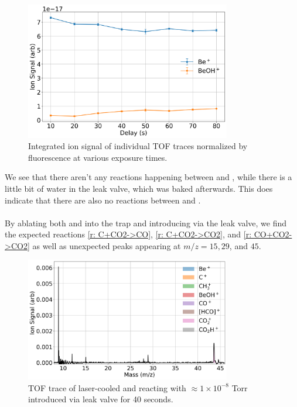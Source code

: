 \begin{figure}[H]
	\label{fig: Be+CO2 traces}
	\centering
	\includegraphics[width=0.8\textwidth]{images/Be_CO2_traces.png}
	\caption{Integrated ion signal of individual TOF traces normalized by  fluorescence at various  exposure times.}
\end{figure}

We see that there aren't any reactions happening between  and , while there is a little bit of water in the leak valve, which was baked afterwards. This does indicate that there are also no reactions between  and .

\paragraph{}
By ablating both  and  into the trap and introducing  via the leak valve, we find the expected reactions \ref{r: C+CO2->CO}, \ref{r: C+CO2->CO2}, and \ref{r: CO+CO2->CO2} as well as unexpected peaks appearing at $m/z=15, 29$, and $45$.

\begin{figure}
	\label{fig: C+CO2 TOF}
	\centering
	\includegraphics[width=0.8\textwidth]{images/C_CO2_TOF.png}
	\caption{TOF trace of laser-cooled  and  reacting with $\approx 1 \times 10^{-8}$ Torr  introduced via leak valve for 40 seconds.}
\end{figure}

